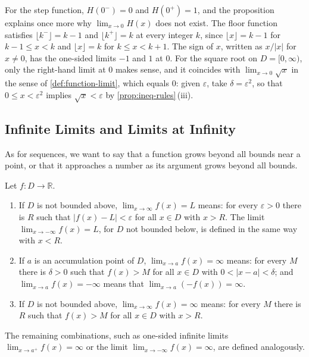 For the step function, $H(0^-)=0$ and $H(0^+)=1$, and the proposition explains once more why $\lim_{x\to0}H(x)$ does not exist. The floor function satisfies $\lfloor k^-\rfloor=k-1$ and $\lfloor k^+\rfloor=k$ at every integer $k$, since $\lfloor x\rfloor=k-1$ for $k-1\le x<k$ and $\lfloor x\rfloor=k$ for $k\le x<k+1$. The sign of $x$, written as $x/|x|$ for $x\ne0$, has the one-sided limits $-1$ and $1$ at $0$. For the square root on $D=[0,\infty)$, only the right-hand limit at $0$ makes sense, and it coincides with $\lim_{x\to0}\sqrt x$ in the sense of \cref{def:function-limit}, which equals $0$: given $\varepsilon$, take $\delta=\varepsilon^2$, so that $0\le x<\varepsilon^2$ implies $\sqrt x<\varepsilon$ by \cref{prop:ineq-rules}\,(iii).

\subsection{Infinite Limits and Limits at Infinity}

As for sequences, we want to say that a function grows beyond all bounds near a point, or that it approaches a number as its argument grows beyond all bounds.

\begin{definition}
\label{def:limits-infinity}
Let $f\colon D\to\mathbb R$.
\begin{enumerate}
\item If $D$ is not bounded above, $\lim_{x\to\infty}f(x)=L$ means: for every $\varepsilon>0$ there is $R$ such that $|f(x)-L|<\varepsilon$ for all $x\in D$ with $x>R$. The limit $\lim_{x\to-\infty}f(x)=L$, for $D$ not bounded below, is defined in the same way with $x<R$.
\item If $a$ is an accumulation point of $D$, $\lim_{x\to a}f(x)=\infty$ means: for every $M$ there is $\delta>0$ such that $f(x)>M$ for all $x\in D$ with $0<|x-a|<\delta$; and $\lim_{x\to a}f(x)=-\infty$ means that $\lim_{x\to a}(-f(x))=\infty$.
\item If $D$ is not bounded above, $\lim_{x\to\infty}f(x)=\infty$ means: for every $M$ there is $R$ such that $f(x)>M$ for all $x\in D$ with $x>R$.
\end{enumerate}
The remaining combinations, such as one-sided infinite limits $\lim_{x\to a^+}f(x)=\infty$ or the limit $\lim_{x\to-\infty}f(x)=\infty$, are defined analogously.
\end{definition}

